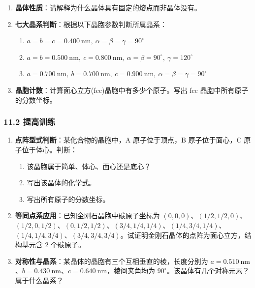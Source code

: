 \begin{enumerate}
\def\labelenumi{\arabic{enumi}.}
\item
  \textbf{晶体性质}：请解释为什么晶体具有固定的熔点而非晶体没有。
\item
  \textbf{七大晶系判断}：根据以下晶胞参数判断所属晶系：

  \begin{enumerate}
  \def\labelenumii{(\arabic{enumii})}
  \tightlist
  \item
    \(a = b = c = 0.400\ \mathrm{nm},\ \alpha = \beta = \gamma = 90^\circ\)
  \item
    \(a = b = 0.500\ \mathrm{nm},\ c = 0.800\ \mathrm{nm},\ \alpha = \beta = 90^\circ,\ \gamma = 120^\circ\)
  \item
    \(a = 0.700\ \mathrm{nm},\ b = 0.700\ \mathrm{nm},\ c = 0.900\ \mathrm{nm},\ \alpha = \beta = \gamma = 90^\circ\)
  \end{enumerate}
\item
  \textbf{晶胞计数}：计算面心立方(fcc)晶胞中有多少个原子。写出 fcc 晶胞中所有原子的分数坐标。
\end{enumerate}

\subsubsection{11.2 提高训练}\label{ux63d0ux9ad8ux8badux7ec3}

\begin{enumerate}
\def\labelenumi{\arabic{enumi}.}
\setcounter{enumi}{3}
\item
  \textbf{点阵型式判断}：某化合物的晶胞中，A 原子位于顶点，B 原子位于面心，C 原子位于体心。判断：

  \begin{enumerate}
  \def\labelenumii{(\arabic{enumii})}
  \tightlist
  \item
    该晶胞属于简单、体心、面心还是底心？
  \item
    写出该晶体的化学式。
  \item
    写出所有原子的分数坐标。
  \end{enumerate}
\item
  \textbf{等同点系应用}：已知金刚石晶胞中碳原子坐标为 \((0, 0, 0)\)、\((1/2, 1/2, 0)\)、\((1/2, 0, 1/2)\)、\((0, 1/2, 1/2)\)、\((3/4, 1/4, 1/4)\)、\((1/4, 3/4, 1/4)\)、\((1/4, 1/4, 3/4)\)、\((3/4, 3/4, 3/4)\)。试证明金刚石晶体的点阵为面心立方，结构基元含 2 个碳原子。
\item
  \textbf{对称性与晶系}：某晶体的晶胞有三个互相垂直的棱，长度分别为 \(a = 0.510\ \mathrm{nm}\)、\(b = 0.430\ \mathrm{nm}\)、\(c = 0.640\ \mathrm{nm}\)，棱间夹角均为 \(90^\circ\)。该晶体有几个对称元素？属于什么晶系？
\end{enumerate}

